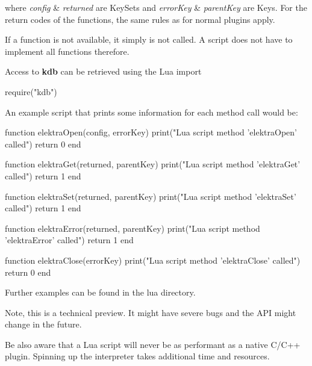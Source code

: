 where {\itshape config} \& {\itshape returned} are Key\+Sets and {\itshape error\+Key} \& {\itshape parent\+Key} are Keys. For the return codes of the functions, the same rules as for normal plugins apply.

If a function is not available, it simply is not called. A script does not have to implement all functions therefore.

Access to {\bfseries kdb} can be retrieved using the Lua import


\begin{DoxyCode}
require("kdb")
\end{DoxyCode}


An example script that prints some information for each method call would be\+:


\begin{DoxyCode}
function elektraOpen(config, errorKey)
  print("Lua script method 'elektraOpen' called")
  return 0
end

function elektraGet(returned, parentKey)
  print("Lua script method 'elektraGet' called")
  return 1
end

function elektraSet(returned, parentKey)
  print("Lua script method 'elektraSet' called")
  return 1
end

function elektraError(returned, parentKey)
  print("Lua script method 'elektraError' called")
  return 1
end

function elektraClose(errorKey)
  print("Lua script method 'elektraClose' called")
  return 0
end
\end{DoxyCode}


Further examples can be found in the lua directory.

Note, this is a technical preview. It might have severe bugs and the A\+PI might change in the future.

Be also aware that a Lua script will never be as performant as a native C/\+C++ plugin. Spinning up the interpreter takes additional time and resources. 